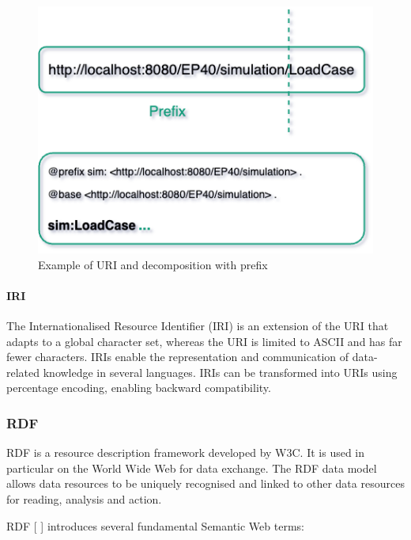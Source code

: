         \begin{figure}[H]
            \centering
            \includegraphics[scale=0.6]{images/Foundation-URI Decomposition.drawio.png}
            \caption{\label{fig:uri-example} Example of URI and decomposition with prefix}
        \end{figure}

        
        \paragraph{IRI}
        The Internationalised Resource Identifier (IRI) is an extension of the URI that adapts to a global character set, whereas the URI is limited to ASCII and has far fewer characters. IRIs enable the representation and communication of data-related knowledge in several languages. IRIs can be transformed into URIs using percentage encoding, enabling backward compatibility.


    \subsubsection{RDF}
    RDF is a resource description framework developed by W3C. It is used in particular on the World Wide Web for data exchange. The RDF data model allows data resources to be uniquely recognised and linked to other data resources for reading, analysis and action. 

    RDF [ ] introduces several fundamental Semantic Web terms:

